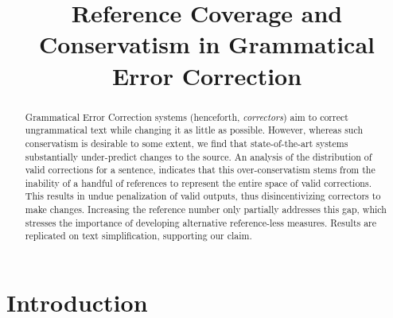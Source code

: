 \documentclass[letterpaper, 11pt]{article}
\newcommand{\lc}[1]{\footnote{\color{blue}LC: #1}}
\begin{document}
\title{Reference Coverage and Conservatism in Grammatical Error Correction}
\maketitle

\begin{abstract}
  Grammatical Error Correction systems (henceforth, {\it correctors}) aim to
  correct ungrammatical text while changing it as little as possible.
  However, whereas such conservatism is desirable to some extent,
  we find that state-of-the-art systems substantially under-predict
  changes to the source. 
  An analysis of the distribution of valid corrections for a sentence,   
  indicates that this over-conservatism stems from
  the inability of a handful of references to represent the entire space of valid
  corrections. This results in undue penalization of valid outputs,
  thus disincentivizing correctors to make changes.
  Increasing the reference number only partially addresses this gap,
  which stresses the importance of developing alternative reference-less measures.
	Results are replicated on text simplification, supporting our claim.
\end{abstract}

\section{Introduction}
\end{document}
